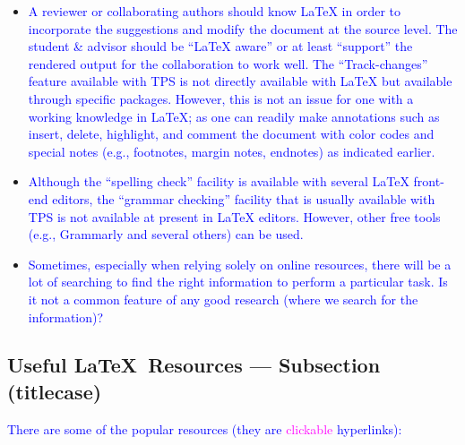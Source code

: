 \documentclass[phd]{ndsu-thesis-2022}
\newcommand\italk[1]{\textcolor{blue}{#1}}  %
\newcommand\lx{\LaTeX\xspace}
\begin{document}
\begin{itemize}[leftmargin=*, itemsep=0pt, parsep=3pt]
\item \italk{A reviewer or collaborating authors should know \lx in order to incorporate the suggestions and modify the document at the source level. The student \& advisor should be ``\lx aware'' or at least ``support'' the rendered output for the collaboration to work well.  The ``Track-changes'' feature available with TPS is not directly available with \lx but available through specific packages. However, this is not an issue for one with a working knowledge in \lx; as one can readily make annotations such as insert, delete, highlight, and comment the document with color codes and special notes (e.g., footnotes, margin notes, endnotes) as indicated earlier.} 

\item \italk{Although the ``spelling check'' facility is available with several \lx front-end editors, the ``grammar checking'' facility that is usually available with TPS is not available at present in \lx editors. However, other free tools (e.g., Grammarly and several others) can be used.}  

\item \italk{Sometimes, especially when relying solely on online resources, there will be a lot of searching to find the right information to perform a particular task. Is it not a common feature of any good research (where we search for the information)?} 

\end{itemize}

\subsection{Useful \LaTeX\ Resources --- Subsection (titlecase)} 

\italk{There are some of the popular resources (they are \textcolor{magenta}{clickable} hyperlinks):}
\end{document}
